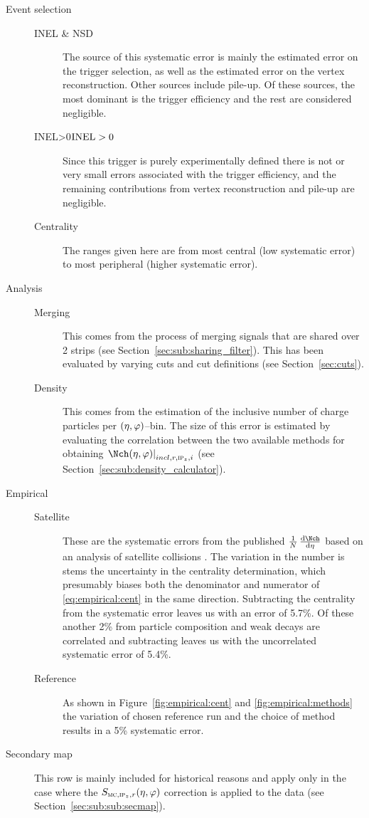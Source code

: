 \documentclass[compat,11pt]{alicenote}
\DeclareRobustCommand{\AlwaysText}[1]{\ifmmode\relax\text{#1}\else #1\fi}
\newcommand*\INEL{\AlwaysText{INEL}}
\newcommand*\NSD{\AlwaysText{NSD}}
\newcommand*\INELGT{\ifmmode\INEL>0\else$\INEL>0$\fi}
\newcommand*{\etaphi}{\ensuremath(\eta,\varphi)}
\newcommand*\SecMap{\ensuremath S_{\subMC,\subIPz,r}\etaphi}
\newcommand{\secref}[1]{Section~\ref{#1}}
\newcommand{\figref}[1]{Figure~\ref{#1}}
\newcommand{\dndetadphi}[1][]{{\ensuremath%
    \ifx|#1|\else\left.\fi%
      \Nch\etaphi%
      \ifx|#1|\else\right|_{#1}\fi}}
\begin{document}
\begin{description}
\item[Event selection] \hbox{}\hfill
  \begin{description}
  \item[\INEL{} \& \NSD{}] The source of this systematic error is
    mainly the estimated error on the trigger selection, as well as
    the estimated error on the vertex reconstruction.  Other sources
    include pile-up.  Of these sources, the most dominant is the
    trigger efficiency and the rest are considered negligible.
  \item[\INELGT{}] Since this trigger is purely experimentally defined
    there is not or very small errors associated with the trigger
    efficiency, and the remaining contributions from vertex
    reconstruction and pile-up are negligible.
  \item[Centrality] The ranges given here are from most central (low
    systematic error) to most peripheral (higher systematic error). 
  \end{description}
\item[Analysis] \hbox{}\hfill
  \begin{description}
  \item[Merging] This comes from the process of merging signals that
    are shared over 2 strips (see \secref{sec:sub:sharing_filter}).
    This has been evaluated by varying cuts and cut definitions (see
    \secref{sec:cuts}).
  \item[Density] This comes from the estimation of the inclusive
    number of charge particles per $\etaphi$--bin.  The size of this
    error is estimated by evaluating the correlation between the two
    available methods for obtaining $\dndetadphi[incl,r,\subIPz,i]$ (see
    \secref{sec:sub:density_calculator}). 
  \end{description}
\item[Empirical] \hbox{}\hfill 
  \begin{description}
  \item[Satellite] These are the systematic errors from the published
    $\ndndeta$ based on an analysis of satellite collisions
    \cite{Abbas:2013bpa}.  The variation in the number is stems the
    uncertainty in the centrality determination, which presumably
    biases both the denominator and numerator of
    \eqref{eq:empirical:cent} in the same direction. Subtracting the
    centrality from the systematic error leaves us with an error of
    5.7\%.  Of these another 2\% from particle composition and weak
    decays are correlated and subtracting leaves us with the
    uncorrelated systematic error of 5.4\%. 
  \item[Reference] As shown in \figref{fig:empirical:cent} and
    \ref{fig:empirical:methods} the variation of chosen reference run
    and the choice of method results in a 5\% systematic error. 
  \end{description}
\item[Secondary map] This row is mainly included for historical
  reasons and apply only in the case where the $\SecMap$ correction is
  applied to the data (see \secref{sec:sub:sub:secmap}). 
\end{description}
\end{document}
